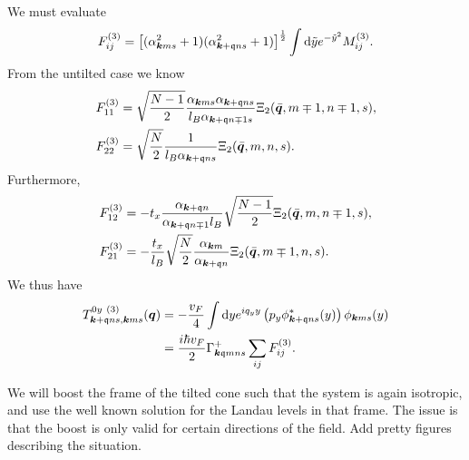 We must evaluate
\begin{equation}
  \label{eq:88}
  F^{(3)}_{ij} = \left[(\alpha_{\bm{k} m s}^2  + 1) ( \alpha _{\bm{k} + \mathfrak{q} ns}^2 + 1 )\right]^{\frac{1}{2}} \int \mathrm{d} \tilde{y} e^{-\tilde{y}^2} M^{(3)}_{ij}.
\end{equation}
From the untilted case we know
\begin{align}
  F^{(3)}_{11} &= \sqrt{\frac{N-1}{2}}
                 \frac{\alpha_{\bm{k} m s} \alpha_{\bm{k}+\mathfrak{q} n s}}{l_{B} \alpha _{\bm{k} + \mathfrak{q} n \mp 1 s}}
                 \Xi_2( \bar{\bm{q}}, m\mp 1, n\mp 1, s ),\\
  F^{(3)}_{22} &= \sqrt{\frac{N}{2}}
                 \frac{1}{l_{B} \alpha _{\bm{k} + \mathfrak{q} n s}}
                 \Xi_{2} (\bar{\bm{q}}, m, n, s).
\end{align}
Furthermore,
\begin{align}
  F^{(3)}_{12} &= -t_x \frac{\alpha _{\bm{k} + \mathfrak{q} n}}{\alpha _{\bm{k}+\mathfrak{q} n \mp 1} l_{B}}
                 \sqrt{\frac{N-1}{2}}
                 \Xi_{2} (\bar{\bm{q}}, m, n \mp 1, s),\\
  F^{(3)}_{21} &= -\frac{t_x}{l_{B}}
                 \sqrt{\frac{N}{2}}
                 \frac{\alpha_{\bm{k} m}}{\alpha _{\bm{k} + \mathfrak{q} n}}
                 \Xi_2 ( \bar{\bm{q}}, m \mp 1, n, s ).
\end{align}
We thus have
\begin{align}
  \label{eq:89}
  T^{0y~(3)}_{\bm{k} + \mathfrak{q} ns, \bm{k} ms} (\bm{q})
  &= - \frac{v_F}{4}
    \int \mathrm{d} y
    e^{i q_y y}
    \left( p_y \phi ^{*}_{\bm{k} + \mathfrak{q} ns}(y) \right) \phi _{\bm{k} m s}(y)\\
  &= \frac{i \hbar v_F}{2}
    \Gamma ^{+}_{\bm{k} \mathfrak{q} m n s}
    \sum\limits_{ij}^{} F^{(3)}_{ij}.
\end{align}











We will boost the frame of the tilted cone such that the system is again isotropic, and use the well known solution for the Landau levels in that frame.
The issue is that the boost is only valid for certain directions of the field.
Add pretty figures describing the situation.


